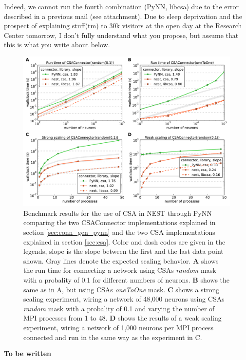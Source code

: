 \documentclass{frontiersSCNS} %
\newcommand{\tbw}[1]{{\bf\parindent0pt\color{red}#1}}
\begin{document}
Indeed, we cannot run the fourth combination (PyNN, libcsa) due to the
error described in a previous mail (see attachment). Due to sleep
deprivation and the prospect of explaining stuff(tm) to 30k visitors
at the open day at the Research Center tomorrow, I don't fully
understand what you propose, but assume that this is what you write
about below.

\begin{figure}[ht]
\centering
\includegraphics[scale=.7]{benchmarks/CSAConnector/CSAConnector.pdf}
\caption{Benchmark results for the use of CSA in NEST through PyNN
  comparing the two CSAConnector implementations explained in section
  \ref{sec:conn_gen_pynn} and the two CSA implementations explained in
  section \ref{sec:csa}. Color and dash codes are given in the
  legends, slope is the slope between the first and the last data
  point shown. Gray lines denote the expected scaling behavior.
  \textbf{A} shows the run time for connecting a network using CSAs
  \emph{random} mask with a probality of 0.1 for different numbers of
  neurons. \textbf{B} shows the same as in A, but using CSAs
  \emph{oneToOne} mask. \textbf{C} shows a strong scaling experiment,
  wiring a network of 48,000 neurons using CSAs \emph{random} mask
  with a probality of 0.1 and varying the number of MPI processes from
  1 to 48. \textbf{D} shows the results of a weak scaling experiment,
  wiring a network of 1,000 neurons per MPI process connected and run
  in the same way as the experiment in C.}\label{fig:pynn_benchmarks}
\end{figure}

\tbw{To be written}
\end{document}
